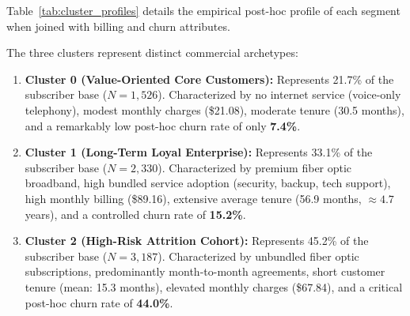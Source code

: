 \documentclass[12pt,a4paper]{report}
\newcommand{\clusterZeroName}{Value-Oriented Core Customers}
\newcommand{\clusterZeroSize}{1,526}
\newcommand{\clusterZeroProp}{21.7\%}
\newcommand{\clusterZeroChurn}{7.4\%}
\newcommand{\clusterZeroTenure}{30.5}
\newcommand{\clusterZeroMonthly}{\$21.08}
\newcommand{\clusterOneName}{Long-Term Loyal Enterprise}
\newcommand{\clusterOneSize}{2,330}
\newcommand{\clusterOneProp}{33.1\%}
\newcommand{\clusterOneChurn}{15.2\%}
\newcommand{\clusterOneTenure}{56.9}
\newcommand{\clusterOneMonthly}{\$89.16}
\newcommand{\clusterTwoName}{High-Risk Attrition Cohort}
\newcommand{\clusterTwoSize}{3,187}
\newcommand{\clusterTwoProp}{45.2\%}
\newcommand{\clusterTwoChurn}{44.0\%}
\newcommand{\clusterTwoTenure}{15.3}
\newcommand{\clusterTwoMonthly}{\$67.84}
\begin{document}
Table~\ref{tab:cluster_profiles} details the empirical post-hoc profile of each segment when joined with billing and churn attributes.

\begin{table}[H]
\centering
\caption{K-Means Customer Segmentation Profiles ($k=3$)}
\label{tab:cluster_profiles}
\end{table}

The three clusters represent distinct commercial archetypes:
\begin{enumerate}
    \item \textbf{Cluster 0 (\clusterZeroName{}):} Represents \clusterZeroProp{} of the subscriber base ($N=\clusterZeroSize{}$). Characterized by no internet service (voice-only telephony), modest monthly charges (\clusterZeroMonthly{}), moderate tenure (\clusterZeroTenure{} months), and a remarkably low post-hoc churn rate of only \textbf{\clusterZeroChurn{}}.
    \item \textbf{Cluster 1 (\clusterOneName{}):} Represents \clusterOneProp{} of the subscriber base ($N=\clusterOneSize{}$). Characterized by premium fiber optic broadband, high bundled service adoption (security, backup, tech support), high monthly billing (\clusterOneMonthly{}), extensive average tenure (\clusterOneTenure{} months, $\approx 4.7$ years), and a controlled churn rate of \textbf{\clusterOneChurn{}}.
    \item \textbf{Cluster 2 (\clusterTwoName{}):} Represents \clusterTwoProp{} of the subscriber base ($N=\clusterTwoSize{}$). Characterized by unbundled fiber optic subscriptions, predominantly month-to-month agreements, short customer tenure (mean: \clusterTwoTenure{} months), elevated monthly charges (\clusterTwoMonthly{}), and a critical post-hoc churn rate of \textbf{\clusterTwoChurn{}}.
\end{enumerate}
\end{document}
